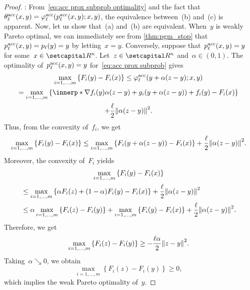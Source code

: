\documentclass[../main]{subfiles}
\begin{document}
\begin{proof}
    : From~\cref{eq:acc prox subprob optimality} and the fact that~$\theta^{\mathrm{acc}}_\ell(x, y) = \varphi^{\mathrm{acc}}_\ell(p^{\mathrm{acc}}_\ell(x, y); x, y)$, the equivalence between~(b) and~(c) is apparent.
    Now, let us show that~(a) and~(b) are equivalent.
    When~$y$ is weakly Pareto optimal, we can immediately see from \cref{thm:pgm_stop} that~$p^{\mathrm{acc}}_\ell(x, y) = p_\ell(y) = y$ by letting~$x = y$.
    Conversely, suppose that~$p^{\mathrm{acc}}_\ell(x, y) = y$ for some~$x \in \setR^n$.
    Let~$z \in \setR^n$ and~$\alpha \in (0, 1)$.
    The optimality of~$p^{\mathrm{acc}}_\ell(x, y) = y$ for~\cref{eq:acc prox subprob} gives
    \begin{multline}
        \max_{i = 1, \dots, m} \left\{ F_i(y) - F_i(x) \right\} \le \varphi^\acc_\ell(y + \alpha (z - y); x, y) \\
        = \max_{i = 1, \dots, m} \left\{ \innerp*{\nabla f_i(y)}{\alpha (z - y)} + g_i(y + \alpha (z - y)) + f_i(y) - F_i(x) \right\} \\
        + \frac{\ell}{2} \norm*{\alpha (z - y)}^2
    .\end{multline}
    Thus, from the convexity of~$f_i$, we get
    \[
            \max_{i = 1, \dots, m}\left\{ F_i(y) - F_i(x) \right\} \le \max_{i = 1, \dots, m}\left\{ F_i(y + \alpha (z - y)) - F_i(x) \right\} + \frac{\ell}{2} \norm*{\alpha (z - y)}^2
    .\]
    Moreover, the convexity of~$F_i$ yields
    \begin{multline}
        \max_{i = 1, \dots, m}\left\{ F_i(y) - F_i(x) \right\} \\
        \begin{split}
        &\le \max_{i = 1, \dots, m}\left\{  \alpha F_i(z) + (1 - \alpha) F_i(y) - F_i(x)  \right\} + \frac{\ell}{2} \norm*{\alpha (z - y) }^2 \\
        &\le \alpha \max_{i = 1, \dots, m}\left\{  F_i(z) - F_i(y) \right\} + \max_{i = 1, \dots, m}\left\{ F_i(y) - F_i(x)  \right\} + \frac{\ell}{2} \norm*{\alpha (z - y) }^2
        .\end{split}
    \end{multline}
    Therefore, we get
    \[
        \max_{i = 1, \dots, m}\left\{  F_i(z) - F_i(y)  \right\} \ge - \frac{\ell \alpha}{2} \norm*{z - y }^2
    .\]
    Taking~$\alpha \searrow 0$, we obtain
    \[
        \max_{i = 1, \dots, m}\left\{  F_i(z) - F_i(y)  \right\} \ge 0
    ,\]
    which implies the weak Pareto optimality of~$y$.


\end{proof}
\end{document}
